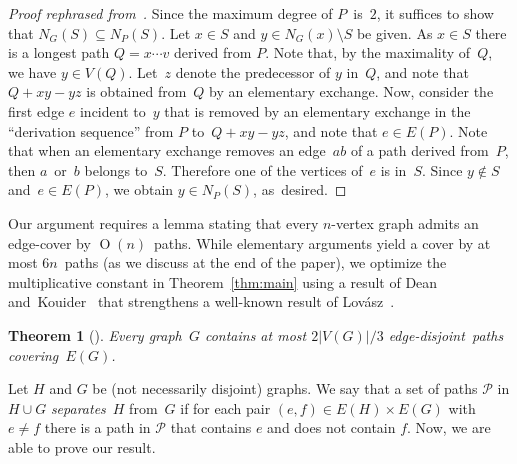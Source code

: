 \documentclass[11pt]{article}
\newcommand{\defi}[1]{\emph{#1}}
\DeclareMathOperator{\bigoh}{\mathrm{O}}
\newtheorem{theorem}{Theorem}
\begin{document}
\begin{proof}[{Proof rephrased from~{\cite[Lemma 2.6]{brandt2006global}}}]
  Since the maximum degree of \(P\)~is~\(2\), it suffices to show  that \(N_G(S) \subseteq N_P(S)\).
  Let \(x\in S\) and \(y\in N_G(x)\setminus S\) be given.
  As \(x\in S\) there is a longest path \(Q = x \cdots v\) derived from \(P\).
  Note that, by the maximality of~\(Q\), we have $y\in V(Q)$.
  Let~\(z\) denote the predecessor of \(y\) in~\(Q\),
  and note that \(Q + xy - yz\) is obtained from~\(Q\) by an elementary exchange.
  Now, consider the first edge \(e\) incident to~\(y\) that is removed by
  an elementary exchange in the ``derivation sequence'' from \(P\) to~\(Q + xy - yz\),
  and note that \(e\in E(P)\).
  Note that when an elementary exchange removes an edge~\(ab\) of a path derived from~\(P\),
  then \(a\)~or~\(b\) belongs to~\(S\).
  Therefore one of the vertices of~$e$ is in~$S$. Since $y \not\in S$ and~$e \in E(P)$,
  we obtain \(y\in N_P(S)\), as~desired.
\end{proof}


Our argument requires a lemma stating that every $n$-vertex graph admits an edge-cover
by $\bigoh(n)$~paths.
  While elementary arguments yield a cover by at most \(6n\)~paths
  (as we discuss at the end of the paper),
  we optimize the multiplicative constant in Theorem~\ref{thm:main}
  using a result of Dean and~Kouider~\cite{dean2000gallai}
  that strengthens a well-known result of Lovász~\cite{lovasz1968covering}.

\begin{theorem}[\cite{dean2000gallai}]\label{thm:dean-kouider}
  Every graph~$G$ contains at most \(2|V(G)|/3\) edge-disjoint~paths covering~$E(G)$.
\end{theorem}

Let \(H\) and \(G\) be (not necessarily disjoint) graphs.
We say that a set of paths \(\mathcal{P}\) in \(H \cup G\) \defi{separates}~\(H\) from~\(G\)
if for each pair \((e,f) \in E(H) \times E(G)\) with \(e \ne f\)
there is a path in \(\mathcal{P}\) that contains \(e\) and does not contain \(f\).
Now, we are able to prove our result.
\end{document}
